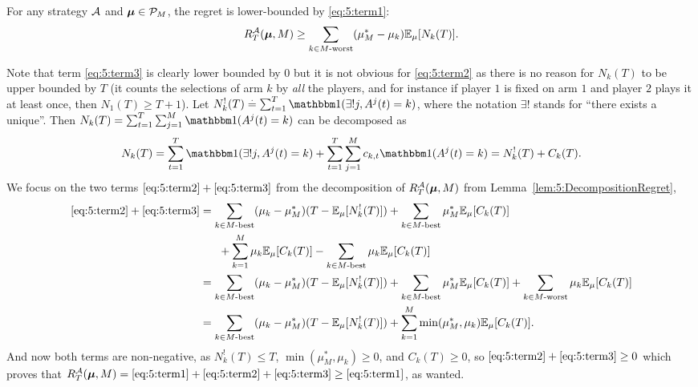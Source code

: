 \begin{lemma}\label{lem:5:1stLowerBound}
\begin{leftbar}[lemmabar]  %
    For any strategy $\mathcal{A}$ and $\boldsymbol{\mu}\in\mathcal{P}_M$, the regret is lower-bounded by \ref{eq:5:term1}:
    \begin{align*}
        R_T^{\mathcal{A}}(\boldsymbol{\mu}, M)    \geq \sum\limits_{k \in M\text{-}\mathrm{worst}} (\mu_M^*- \mu_k) \mathbb{E}_{\mu}[N_k(T)].
    \end{align*}%
\end{leftbar}  %
\end{lemma}

\begin{smallproof}
  Note that term \ref{eq:5:term3} is clearly lower bounded by $0$
  but it is not obvious for \ref{eq:5:term2} as there is no reason for $N_k(T)$ to be upper bounded by $T$ (it counts the selections of arm $k$ by \emph{all} the players, and for instance if player $1$ is fixed on arm $1$ and player $2$ plays it at least once, then $N_1(T) \geq T+1$).
  Let $N_k^{!}(T) \eqdef \sum_{t=1}^{T} \indic(\exists! j, A^j(t)=k)$,
  where the notation $\exists!$ stands for ``there exists a unique''.
  Then $N_k(T) = \sum_{t=1}^{T} \sum_{j=1}^{M} \indic(A^j(t) = k)$ can be decomposed as
  \begin{equation*}
    N_k(T) = \sum_{t=1}^{T} \indic(\exists! j, A^j(t) = k) + \sum_{t=1}^{T} \sum_{j=1}^{M} c_{k,t} \indic(A^j(t) = k)
    = N_k^{!}(T) + C_k(T).
  \end{equation*}
  We focus on the two terms $\ref{eq:5:term2} + \ref{eq:5:term3}$ from the decomposition of $R_T^{\mathcal{A}}(\boldsymbol{\mu}, M)$ from Lemma~\ref{lem:5:DecompositionRegret},
  \begin{align*}
    \ref{eq:5:term2} + \ref{eq:5:term3} &=
    \sum_{k \in M\text{-}\mathrm{best}} (\mu_k - \mu_M^*) (T - \mathbb{E}_{\mu}[N_k^!(T)])
    + \sum_{k \in M\text{-}\mathrm{best}} \mu_M^* \mathbb{E}_{\mu}[C_k(T)] \\
    & \;\;\;\;\;\; + \sum_{k=1}^{M} \mu_k \mathbb{E}_{\mu}[C_k(T)]
    - \sum_{k \in M\text{-}\mathrm{best}} \mu_k \mathbb{E}_{\mu}[C_k(T)] \\
    &=
    \sum_{k \in M\text{-}\mathrm{best}} (\mu_k - \mu_M^*) (T - \mathbb{E}_{\mu}[N_k^!(T)])
    + \sum_{k \in M\text{-}\mathrm{best}} \mu_M^* \mathbb{E}_{\mu}[C_k(T)]
    + \sum_{k \in M\text{-}\mathrm{worst}} \mu_k \mathbb{E}_{\mu}[C_k(T)] \\
    &=
    \sum_{k \in M\text{-}\mathrm{best}} (\mu_k - \mu_M^*) (T - \mathbb{E}_{\mu}[N_k^!(T)])
    + \sum_{k=1}^{M} \min(\mu_M^*, \mu_k) \mathbb{E}_{\mu}[C_k(T)].
  \end{align*}
  And now both terms are non-negative, as $N_k^!(T) \leq T$, $\min(\mu_M^*, \mu_k)\geq 0$, and $C_k(T) \geq 0$, so $\ref{eq:5:term2} + \ref{eq:5:term3} \geq 0$
  which proves that $R_T^{\mathcal{A}}(\boldsymbol{\mu}, M) = \ref{eq:5:term1} + \ref{eq:5:term2} + \ref{eq:5:term3} \geq \ref{eq:5:term1}$, as wanted.
\end{smallproof}


